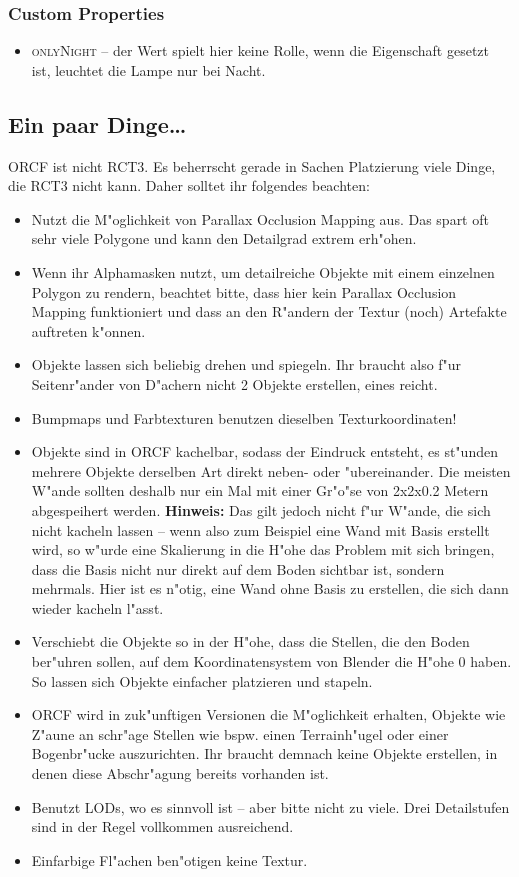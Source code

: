 \documentclass[a4paper]{article}
\newcommand{\ccaption}[1]{\textsc{#1}}
\newcommand{\note}[1]{\textbf{Hinweis:} #1 \par}
\begin{document}
\subsubsection{Custom Properties}
\begin{itemize}
\item \ccaption{onlyNight} -- der Wert spielt hier keine Rolle, wenn die Eigenschaft gesetzt ist, leuchtet die Lampe nur bei Nacht.
\end{itemize}

\subsection{Ein paar Dinge\dots }
ORCF ist nicht RCT3. Es beherrscht gerade in Sachen Platzierung viele Dinge, die RCT3 nicht kann. Daher solltet ihr folgendes beachten:
\begin{itemize}
\item Nutzt die M"oglichkeit von Parallax Occlusion Mapping aus. Das spart oft sehr viele Polygone und kann den Detailgrad extrem erh"ohen.
\item Wenn ihr Alphamasken nutzt, um detailreiche Objekte mit einem einzelnen Polygon zu rendern, beachtet bitte, dass hier kein Parallax Occlusion
  Mapping funktioniert und dass an den R"andern der Textur (noch) Artefakte auftreten k"onnen.
\item Objekte lassen sich beliebig drehen und spiegeln. Ihr braucht also f"ur Seitenr"ander von D"achern nicht 2 Objekte erstellen, eines reicht.
\item Bumpmaps und Farbtexturen benutzen dieselben Texturkoordinaten!
\item Objekte sind in ORCF kachelbar, sodass der Eindruck entsteht, es st"unden mehrere Objekte derselben Art direkt neben- oder "ubereinander.
  Die meisten W"ande sollten deshalb nur ein Mal mit einer Gr"o"se von 2x2x0.2 Metern abgespeihert werden. \note{Das gilt jedoch
  nicht f"ur W"ande, die sich nicht kacheln lassen -- wenn also zum Beispiel eine Wand mit Basis erstellt wird, so w"urde eine Skalierung in die H"ohe
  das Problem mit sich bringen, dass die Basis nicht nur direkt auf dem Boden sichtbar ist, sondern mehrmals. Hier ist es n"otig, eine Wand ohne Basis
  zu erstellen, die sich dann wieder kacheln l"asst.}
\item Verschiebt die Objekte so in der H"ohe, dass die Stellen, die den Boden ber"uhren sollen, auf dem Koordinatensystem von Blender die H"ohe 0 haben.
  So lassen sich Objekte einfacher platzieren und stapeln.
\item ORCF wird in zuk"unftigen Versionen die M"oglichkeit erhalten, Objekte wie Z"aune an schr"age Stellen wie bspw. einen Terrainh"ugel oder einer
  Bogenbr"ucke auszurichten. Ihr braucht demnach keine Objekte erstellen, in denen diese Abschr"agung bereits vorhanden ist.
\item Benutzt LODs, wo es sinnvoll ist -- aber bitte nicht zu viele. Drei Detailstufen sind in der Regel vollkommen ausreichend.
\item Einfarbige Fl"achen ben"otigen keine Textur.
\end{itemize}
\end{document}
